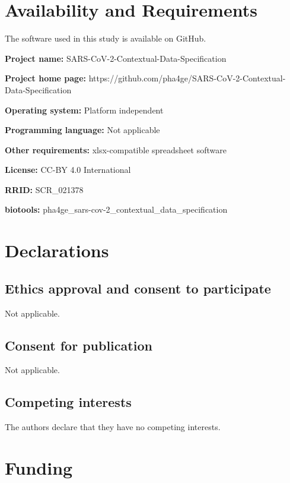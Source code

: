 \section{Availability and Requirements}

The software used in this study is available on GitHub. 

\textbf{Project name:} SARS-CoV-2-Contextual-Data-Specification

\textbf{Project home page:} https://github.com/pha4ge/SARS-CoV-2-Contextual-Data-Specification

\textbf{Operating system:} Platform independent

\textbf{Programming language:} Not applicable

\textbf{Other requirements:} xlsx-compatible spreadsheet software

\textbf{License: }CC-BY 4.0 International

\textbf{RRID:} SCR\_021378

\textbf{biotools:} pha4ge\_sars-cov-2\_contextual\_data\_specification

\section{Declarations}

\subsection{Ethics approval and consent to participate}

Not applicable.

\subsection{Consent for publication}

Not applicable.


\subsection{Competing interests}

The authors declare that they have no competing interests.

\section{Funding}

